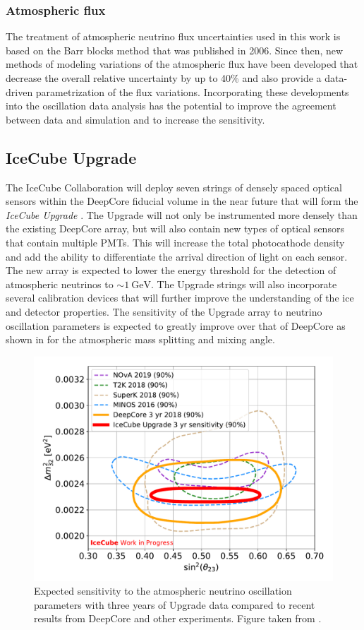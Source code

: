 \subsubsection{Atmospheric flux}
The treatment of atmospheric neutrino flux uncertainties used in this work is based on the Barr blocks method that was published in 2006\cite{Barr2006}. Since then, new methods of modeling variations of the atmospheric flux have been developed that decrease the overall relative uncertainty by up to 40\% and also provide a data-driven parametrization of the flux variations. Incorporating these developments into the oscillation data analysis has the potential to improve the agreement between data and simulation and to increase the sensitivity.

\subsection{IceCube Upgrade}
The IceCube Collaboration will deploy seven strings of densely spaced optical sensors within the DeepCore fiducial volume in the near future that will form the \emph{IceCube Upgrade} . The Upgrade will not only be instrumented more densely than the existing DeepCore array, but will also contain new types of optical sensors that contain multiple PMTs. This will increase the total photocathode density and add the ability to differentiate the arrival direction of light on each sensor. The new array is expected to lower the energy threshold for the detection of atmospheric neutrinos to $\sim\SI{1}{\giga\electronvolt}$. The Upgrade strings will also incorporate several calibration devices that will further improve the understanding of the ice and detector properties. The sensitivity of the Upgrade array to neutrino oscillation parameters is expected to greatly improve over that of DeepCore as shown in  for the atmospheric mass splitting and mixing angle.
\begin{figure}
    \centering
    \includegraphics[width=0.7\linewidth]{figures/summary/June26_Upgrade_NuMu_Disappearance_Sensitivity.pdf}
    \caption{Expected sensitivity to the atmospheric neutrino oscillation parameters with three years of Upgrade data compared to recent results from DeepCore and other experiments. Figure taken from \cite{icecube_upgrade}.\label{fig:upgrade-sensitivity}}
\end{figure}


